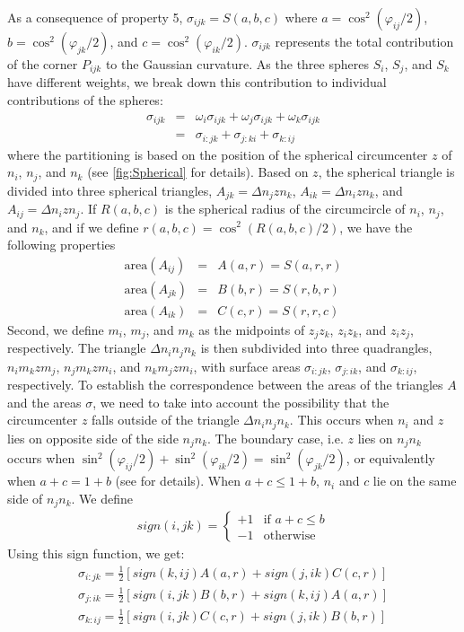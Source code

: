 \documentclass[11 pt]{article}
\theoremstyle{plain} \theorembodyfont{\rmfamily}
\begin{document}
 As a consequence of property 5, $\sigma_{ijk}=S(a,b,c)$ where $a=\cos^2(\varphi_{ij}/2)$, $b=\cos^2(\varphi_{jk}/2)$, and $c=\cos^2(\varphi_{ik}/2)$. $\sigma_{ijk}$ represents the total contribution of the corner $P_{ijk}$ to the Gaussian curvature. As the three spheres $S_i$, $S_j$, and $S_k$ have different weights, we break down this contribution to individual contributions of the spheres:
 \begin{eqnarray} 
  \sigma_{ijk} &=& \omega_i \sigma_{ijk}  + \omega_j \sigma_{ijk} + \omega_k \sigma_{ijk} \nonumber \\
  &=& \sigma_{i:jk}  +  \sigma_{j:ki} +  \sigma_{k: ij} 
 \end{eqnarray}
where the partitioning is based on the position of the spherical circumcenter $z$ of $n_i$, $n_j$, and $n_k$ (see \ref{fig:Spherical} for details).   Based on $z$, the spherical triangle is divided into three spherical triangles, $A_{jk} = \Delta n_j z n_k$, $A_{ik}=\Delta n_i z n_k$, and $A_{ij}=\Delta n_i z n_j$. If $R(a,b,c)$ is the spherical radius of the circumcircle of $n_i$, $n_j$, and $n_k$, and if we define $r(a,b,c)=\cos^2(R(a,b,c)/2)$, we have the following properties
\begin{eqnarray}
\text{area}(A_{ij}) &=& A(a,r) = S(a,r,r) \nonumber \\
\text{area}(A_{jk})  &=& B(b,r) = S(r,b,r) \nonumber \\
\text{area}(A_{ik})  &=& C(c,r) = S(r,r,c) 
\end{eqnarray}
Second, we define $m_i$, $m_j$, and $m_k$ as the midpoints of $z_j z_k$, $z_i z_k$, and $z_i z_j$, respectively. The triangle $\Delta n_i n_j n_k$ is then subdivided into three quadrangles, $n_i m_k z m_j$, $n_j m_k z m_i$, and $n_k m_j z m_i$, with surface areas $\sigma_{i:jk}$, $\sigma_{j:ik}$, and $\sigma_{k:ij}$, respectively. To establish the correspondence between the areas of the triangles $A$ and the areas $\sigma$, we need to take into account the possibility that the circumcenter $z$ falls outside of the triangle $\Delta n_i n_j n_k$. This occurs when $n_i$ and $z$ lies on opposite side of the side $n_j n_k$. The boundary case, i.e. $z$ lies on $n_j n_k$ occurs when $\sin^2 (\varphi_{ij}/2) + \sin^2 (\varphi_{ik}/2) = \sin^2 (\varphi_{jk}/2)$, or equivalently when $a + c = 1 + b$ (see \cite{AkEd19b} for details). When $a+c \le 1 +b$, $n_i$ and $c$ lie on the same side of $n_j n_k$. We define
\begin{eqnarray}
sign(i,jk) = \begin{cases}
+1 &\text{if $a+c \le b$}\\
-1 &\text{otherwise}
\end{cases}
\end{eqnarray}
Using this sign function, we get:
\begin{eqnarray}
\sigma_{i:jk} = \frac{1}{2} \left[ sign(k,ij) A(a,r) + sign(j,ik) C(c,r)\right] \nonumber \\
\sigma_{j:ik} = \frac{1}{2} \left[ sign(i,jk) B(b,r) + sign(k,ij) A(a,r) \right] \nonumber \\
\sigma_{k:ij} = \frac{1}{2} \left[ sign(i,jk) C(c,r) + sign(j,ik) B(b,r) \right]
\label{eqn:sig}
\end{eqnarray}
\end{document}
